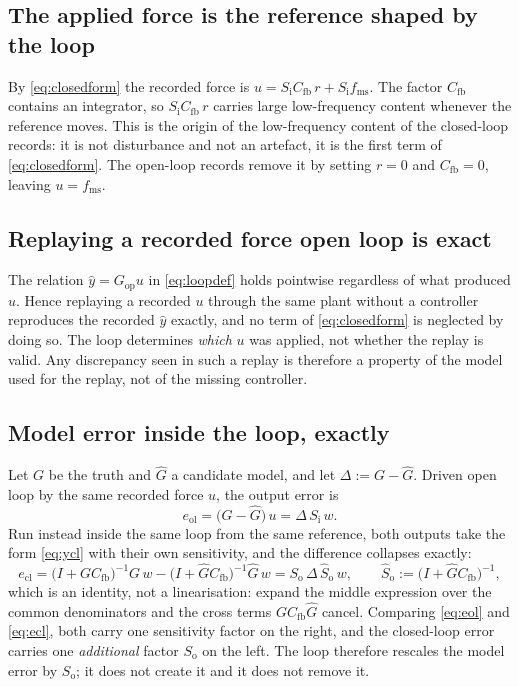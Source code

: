 \documentclass[11pt]{article}
\newcommand{\yh}{\hat{y}}
\newcommand{\Cfb}{C_{\mathrm{fb}}}
\newcommand{\Gop}{G_{\mathrm{op}}}
\newcommand{\So}{S_{\mathrm{o}}}
\newcommand{\Si}{S_{\mathrm{i}}}
\newcommand{\fms}{f_{\mathrm{ms}}}
\begin{document}
\subsection{The applied force is the reference shaped by the loop}

By \eqref{eq:closedform} the recorded force is $u = \Si\Cfb\,r + \Si\fms$. The factor $\Cfb$
contains an integrator, so $\Si\Cfb\,r$ carries large low-frequency content whenever the
reference moves. This is the origin of the low-frequency content of the closed-loop records: it
is not disturbance and not an artefact, it is the first term of \eqref{eq:closedform}. The
open-loop records remove it by setting $r = 0$ and $\Cfb = 0$, leaving $u = \fms$.

\subsection{Replaying a recorded force open loop is exact}

The relation $\yh = \Gop u$ in \eqref{eq:loopdef} holds pointwise regardless of what produced
$u$. Hence replaying a recorded $u$ through the same plant without a controller reproduces the
recorded $\yh$ exactly, and no term of \eqref{eq:closedform} is neglected by doing so. The loop
determines \emph{which} $u$ was applied, not whether the replay is valid. Any discrepancy seen in
such a replay is therefore a property of the model used for the replay, not of the missing
controller.

\subsection{Model error inside the loop, exactly}

Let $G$ be the truth and $\hat G$ a candidate model, and let $\Delta := G - \hat G$. Driven open
loop by the same recorded force $u$, the output error is
\begin{equation}
  e_{\mathrm{ol}} = \big(G - \hat G\big)\,u = \Delta\,\Si\,w .
  \label{eq:eol}
\end{equation}
Run instead inside the same loop from the same reference, both outputs take the form
\eqref{eq:ycl} with their own sensitivity, and the difference collapses exactly:
\begin{equation}
  e_{\mathrm{cl}}
  = \big(I + G\Cfb\big)^{-1}G\,w - \big(I + \hat G\Cfb\big)^{-1}\hat G\,w
  = \So\,\Delta\,\hat S_{\mathrm{o}}\,w ,
  \qquad \hat S_{\mathrm{o}} := \big(I + \hat G\Cfb\big)^{-1} ,
  \label{eq:ecl}
\end{equation}
which is an identity, not a linearisation: expand the middle expression over the common
denominators and the cross terms $G\Cfb\hat G$ cancel. Comparing \eqref{eq:eol} and
\eqref{eq:ecl}, both carry one sensitivity factor on the right, and the closed-loop error carries
one \emph{additional} factor $\So$ on the left. The loop therefore rescales the model error by
$\So$; it does not create it and it does not remove it.
\end{document}
